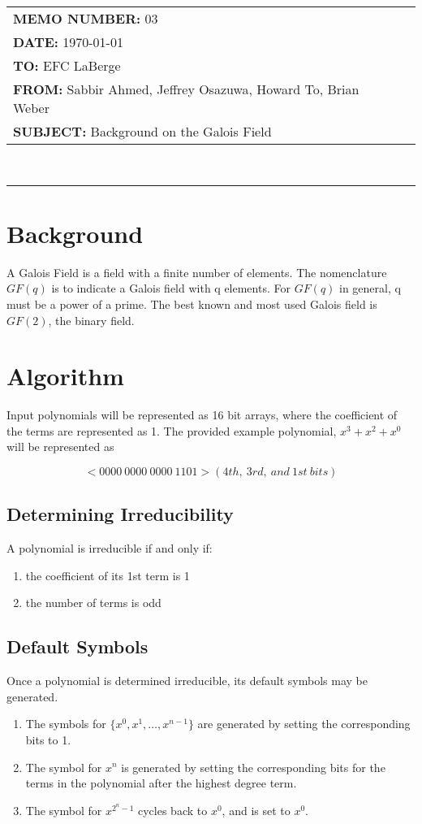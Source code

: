 \documentclass[paper=usletter, fontsize=12pt]{article}
\newcommand{\Sabbir}{Sabbir Ahmed}
\newcommand{\Jeffrey}{Jeffrey Osazuwa}
\newcommand{\Howard}{Howard To}
\newcommand{\Brian}{Brian Weber}
\newcommand{\polynomial}{$x^{3}+x^{2}+x^{0}$}
\newcommand{\documentinfo}[5]{
    \begin{centering}
        \parbox{2in}{
        \begin{spacing}{1}
            \begin{flushleft}
                \begin{tabular}{l l}
                    #1 \\
                    #2 \\
                    #3 \\
                    #4 \\
                    #5 \\
                \end{tabular}\\
                \rule{\textwidth}{1pt}
            \end{flushleft}
        \end{spacing}
        }
    \end{centering}
}
\begin{document}
     \documentinfo{\textbf{MEMO NUMBER:} 03}{\textbf{DATE:} \today}{\textbf{TO: } EFC LaBerge}{\textbf{FROM: }\Sabbir, \Jeffrey, \Howard, \Brian}{\textbf{SUBJECT: } Background on the Galois Field}
    \vspace{-0.1in}

    \section{Background}
    A Galois Field is a field with a finite number of elements. The nomenclature $GF(q)$ is to indicate a Galois field with q elements. For $GF(q)$ in general, q must be a power of a prime. The best known and most used Galois field is $GF(2)$, the binary field.

    \section{Algorithm}
    Input polynomials will be represented as 16 bit arrays, where the coefficient of the terms are represented as 1. The provided example polynomial, \polynomial~ will be represented as

        \[ <0000 \ 0000 \ 0000 \ 1101> (4th, \ 3rd, \ and \ 1st \ bits) \]

        \subsection{Determining Irreducibility}
        A polynomial is irreducible if and only if:
        \begin{enumerate}
            \item the coefficient of its 1st term is 1
            \item the number of terms is odd
        \end{enumerate}

        \subsection{Default Symbols}
        Once a polynomial is determined irreducible, its default symbols may be generated.
        \begin{enumerate}
            \item The symbols for $\{x^{0}, x^{1}, \ldots, x^{n-1}\}$ are generated by setting the corresponding bits to 1.
            \item The symbol for $x^{n}$ is generated by setting the corresponding bits for the terms in the polynomial after the highest degree term.
            \item The symbol for $x^{2^{n}-1}$ cycles back to $x^{0}$, and is set to $x^{0}$.
        \end{enumerate}
\end{document}
